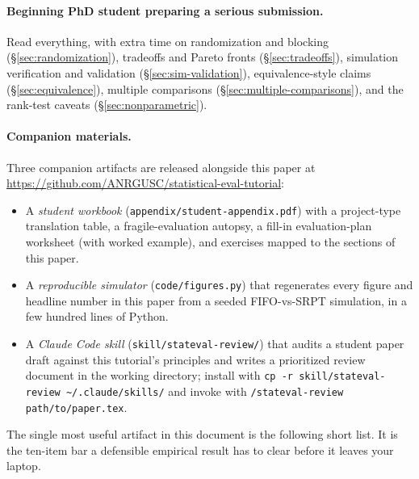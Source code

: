 \documentclass[11pt]{article}
\begin{document}
\paragraph{Beginning PhD student preparing a serious submission.} Read everything, with extra time on randomization and blocking (\S\ref{sec:randomization}), tradeoffs and Pareto fronts (\S\ref{sec:tradeoffs}), simulation verification and validation (\S\ref{sec:sim-validation}), equivalence-style claims (\S\ref{sec:equivalence}), multiple comparisons (\S\ref{sec:multiple-comparisons}), and the rank-test caveats (\S\ref{sec:nonparametric}).

\paragraph{Companion materials.} Three companion artifacts are released alongside this paper at \url{https://github.com/ANRGUSC/statistical-eval-tutorial}:

\begin{itemize}[leftmargin=*, itemsep=1pt, topsep=2pt]
    \item A \emph{student workbook} (\texttt{appendix/student-appendix.pdf}) with a project-type translation table, a fragile-evaluation autopsy, a fill-in evaluation-plan worksheet (with worked example), and exercises mapped to the sections of this paper.
    \item A \emph{reproducible simulator} (\texttt{code/figures.py}) that regenerates every figure and headline number in this paper from a seeded FIFO-vs-SRPT simulation, in a few hundred lines of Python.
    \item A \emph{Claude Code skill} (\texttt{skill/stateval-review/}) that audits a student paper draft against this tutorial's principles and writes a prioritized review document in the working directory; install with \texttt{cp -r skill/stateval-review \textasciitilde/.claude/skills/} and invoke with \texttt{/stateval-review path/to/paper.tex}.
\end{itemize}

\medskip

The single most useful artifact in this document is the following short list. It is the ten-item bar a defensible empirical result has to clear before it leaves your laptop.
\end{document}
